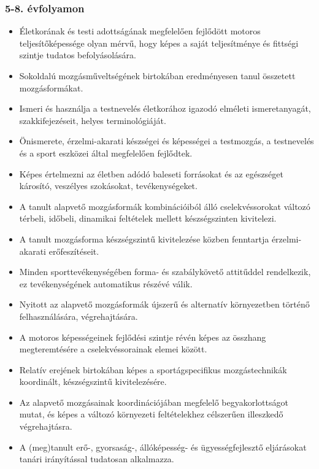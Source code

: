 \hypertarget{evfolyamon-34}{%
\subsubsection{5-8. évfolyamon}\label{evfolyamon-34}}

\begin{itemize}
\item
  Életkorának és testi adottságának megfelelően fejlődött motoros
  teljesítőképessége olyan mérvű, hogy képes a saját teljesítménye és
  fittségi szintje tudatos befolyásolására.
\item
  Sokoldalú mozgásműveltségének birtokában eredményesen tanul összetett
  mozgásformákat.
\item
  Ismeri és használja a testnevelés életkorához igazodó elméleti
  ismeretanyagát, szakkifejezéseit, helyes terminológiáját.
\item
  Önismerete, érzelmi-akarati készségei és képességei a testmozgás, a
  testnevelés és a sport eszközei által megfelelően fejlődtek.
\item
  Képes értelmezni az életben adódó baleseti forrásokat és az egészséget
  károsító, veszélyes szokásokat, tevékenységeket.
\item
  A tanult alapvető mozgásformák kombinációiból álló cselekvéssorokat
  változó térbeli, időbeli, dinamikai feltételek mellett készségszinten
  kivitelezi.
\item
  A tanult mozgásforma készségszintű kivitelezése közben fenntartja
  érzelmi-akarati erőfeszítéseit.
\item
  Minden sporttevékenységében forma- és szabálykövető attitűddel
  rendelkezik, ez tevékenységének automatikus részévé válik.
\item
  Nyitott az alapvető mozgásformák újszerű és alternatív környezetben
  történő felhasználására, végrehajtására.
\item
  A motoros képességeinek fejlődési szintje révén képes az összhang
  megteremtésére a cselekvéssorainak elemei között.
\item
  Relatív erejének birtokában képes a sportágspecifikus mozgástechnikák
  koordinált, készségszintű kivitelezésére.
\item
  Az alapvető mozgásainak koordinációjában megfelelő begyakorlottságot
  mutat, és képes a változó környezeti feltételekhez célszerűen
  illeszkedő végrehajtásra.
\item
  A (meg)tanult erő-, gyorsaság-, állóképesség- és ügyességfejlesztő
  eljárásokat tanári irányítással tudatosan alkalmazza.

\end{itemize}
